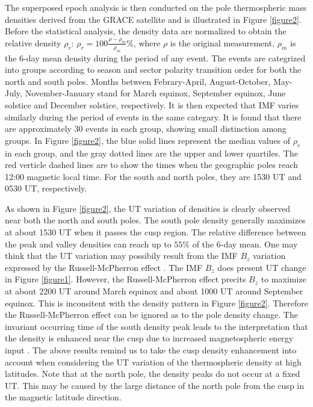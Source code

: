 \documentclass[draft, grl]{/home/guod/Documents/template/agu_template/AGUTeX}
\begin{document}
\begin{article}
    The superposed epoch analysis is then conducted on the pole thermospheric 
    mass densities derived from the GRACE satellite and is illustrated in 
    Figure \ref{figure2}.
    Before the statistical analysis, the density data are normalized to obtain 
    the relative  density $\rho_r$: $\rho_r=100\frac{\rho-\rho_m}{\rho_m}\%$, 
    where $\rho$ is the original measurement, $\rho_m$ is the 6-day mean density
    during the period of any event.
    The events are categrized into groups according to season and sector 
    polarity transition order for both the north and south poles.
    Months between Febrary-April, August-October, May-July, November-January 
    stand for March equinox, September equinox, June solstice and December 
    solstice, respectively.
    It is then expected that IMF varies similarly during the period of events
    in the same categary.
    It is found that there are approximately 30 events in each group, 
    showing small distinction among groups.
    In Figure \ref{figure2}, the blue solid lines represent the median values 
    of $\rho_r$ in each group, and the gray dotted lines are the upper and lower
    quartiles. 
    The red verticle dashed lines are to show the times when the geographic 
    poles reach 12:00 magnetic local time. 
    For the south and north poles, they are 1530 UT and 0530 UT, respectively.

    As shown in Figure \ref{figure2}, the UT variation of densities is 
    clearly observed near both the north and south poles.
    The south pole density generally maximizes at about 1530 UT when it 
    passes the cusp region. 
    The relative difference between the peak and valley densities can reach up
    to $55\%$ of the 6-day mean.
    One may think that the UT variation may possibily result from the IMF $B_z$ 
    variation expressed by the Russell-McPherron effect \citep{Russell1973}. 
    The IMF $B_z$ does present UT change in Figure \ref{figure1}. 
    However, the Russell-McPherron effect precits $B_z$ to maximize at about 
    2200 UT around March equinox and about 1000 UT around September equinox.
    This is inconsitent with the density pattern in Figure \ref{figure2}.
    Therefore the Russell-McPherron effect can be ignored as to the pole density
    change.
    The invariant occurring time of the south density peak leads to the 
    interpretation that the density is enhanced near the cusp due to increased
    magnetospheric energy input \citep{Luhr2004}.
    The above results remind us to take the cusp density enhancement into 
    account when considering the UT variation of the thermospheric density at 
    high latitudes.
    Note that at the north pole, the density peaks do not occur at a fixed UT. 
    This may be caused by the large distance of the north pole from the cusp in 
    the magnetic latitude direction.


\end{article}
\end{document}
